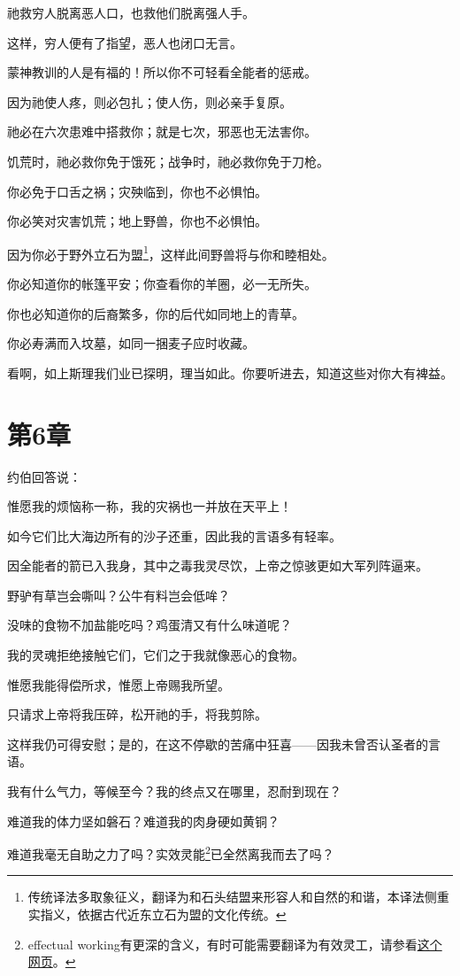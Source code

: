 \documentclass[12pt,oneside]{book}
\begin{document}
祂救穷人脱离恶人口，也救他们脱离强人手。

这样，穷人便有了指望，恶人也闭口无言。

蒙神教训的人是有福的！所以你不可轻看全能者的惩戒。

因为祂使人疼，则必包扎；使人伤，则必亲手复原。

祂必在六次患难中搭救你；就是七次，邪恶也无法害你。

饥荒时，祂必救你免于饿死；战争时，祂必救你免于刀枪。

你必免于口舌之祸；灾殃临到，你也不必惧怕。

你必笑对灾害饥荒；地上野兽，你也不必惧怕。

因为你必于野外立石为盟\footnote{传统译法多取象征义，翻译为和石头结盟来形容人和自然的和谐，本译法侧重实指义，依据古代近东立石为盟的文化传统。}，这样此间野兽将与你和睦相处。

你必知道你的帐篷平安；你查看你的羊圈，必一无所失。

你也必知道你的后裔繁多，你的后代如同地上的青草。

你必寿满而入坟墓，如同一捆麦子应时收藏。

看啊，如上斯理我们业已探明，理当如此。你要听进去，知道这些对你大有裨益。


\chapter{第6章}
约伯回答说：

惟愿我的烦恼称一称，我的灾祸也一并放在天平上！

如今它们比大海边所有的沙子还重，因此我的言语多有轻率。

因全能者的箭已入我身，其中之毒我灵尽饮，上帝之惊骇更如大军列阵逼来。

野驴有草岂会嘶叫？公牛有料岂会低哞？

没味的食物不加盐能吃吗？鸡蛋清又有什么味道呢？

我的灵魂拒绝接触它们，它们之于我就像恶心的食物。

惟愿我能得偿所求，惟愿上帝赐我所望。

只请求上帝将我压碎，松开祂的手，将我剪除。

这样我仍可得安慰；是的，在这不停歇的苦痛中狂喜——因我未曾否认圣者的言语。

我有什么气力，等候至今？我的终点又在哪里，忍耐到现在？

难道我的体力坚如磐石？难道我的肉身硬如黄铜？

难道我毫无自助之力了吗？实效灵能\footnote{effectual working有更深的含义，有时可能需要翻译为有效灵工，请参看\href{https://www.my3bc.com/effectual-working-eph-415-16/}{这个网页}。}已全然离我而去了吗？
\end{document}
